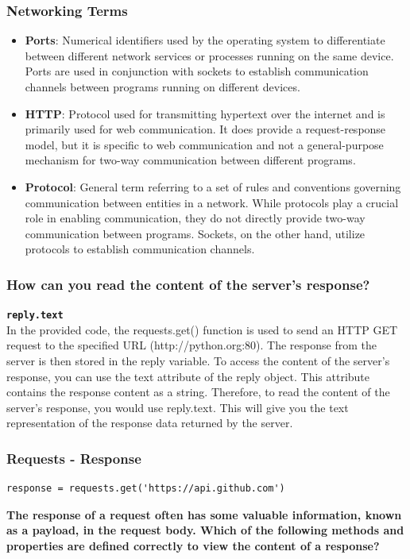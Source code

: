 \subsubsection{Networking Terms}
\begin{itemize}
\item \textbf{Ports}: Numerical identifiers used by the operating system to differentiate between different network services or processes running on the same device. Ports are used in conjunction with sockets to establish communication channels between programs running on different devices.

\item \textbf{HTTP}: Protocol used for transmitting hypertext over the internet and is primarily used for web communication. It does provide a request-response model, but it is specific to web communication and not a general-purpose mechanism for two-way communication between different programs.

\item \textbf{Protocol}: General term referring to a set of rules and conventions governing communication between entities in a network. While protocols play a crucial role in enabling communication, they do not directly provide two-way communication between programs. Sockets, on the other hand, utilize protocols to establish communication channels.
\end{itemize}

\subsubsection{How can you read the content of the server's response?}

\textbf{\texttt{reply.text}}\\
In the provided code, the requests.get() function is used to send an HTTP GET request to the specified URL (http://python.org:80). The response from the server is then stored in the reply variable. To access the content of the server's response, you can use the text attribute of the reply object. This attribute contains the response content as a string. Therefore, to read the content of the server's response, you would use reply.text. This will give you the text representation of the response data returned by the server.

\subsubsection{Requests - Response}
\begin{codebox}
\begin{verbatim}
response = requests.get('https://api.github.com')
\end{verbatim}
\end{codebox}
\textbf{The response of a request often has some valuable information, known as a payload, in the request body. Which of the following methods and properties are defined correctly to view the content of a response?}

